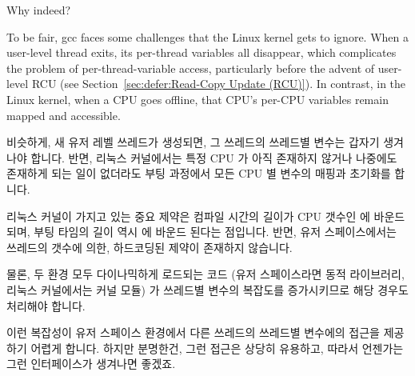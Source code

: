 \begin{enumerate}
	Why indeed?

	To be fair, gcc faces some challenges that the Linux kernel
	gets to ignore.
	When a user-level thread exits, its per-thread variables all
	disappear, which complicates the problem of per-thread-variable
	access, particularly before the advent of user-level RCU
	(see Section~\ref{sec:defer:Read-Copy Update (RCU)}).
	In contrast, in the Linux kernel, when a CPU goes offline,
	that CPU's per-CPU variables remain mapped and accessible.
	\fi

	비슷하게, 새 유저 레벨 쓰레드가 생성되면, 그 쓰레드의 쓰레드별 변수는
	갑자기 생겨나야 합니다.
	반면, 리눅스 커널에서는 특정 CPU 가 아직 존재하지 않거나 나중에도
	존재하게 되는 일이 없더라도 부팅 과정에서 모든 CPU 별 변수의 매핑과
	초기화를 합니다.

	리눅스 커널이 가지고 있는 중요 제약은 컴파일 시간의 길이가 CPU 갯수인
	 에 바운드 되며, 부팅 타임의 길이 역시
	 에 바운드 된다는 점입니다.
	반면, 유저 스페이스에서는 쓰레드의 갯수에 의한, 하드코딩된 제약이
	존재하지 않습니다.

	물론, 두 환경 모두 다이나믹하게 로드되는 코드 (유저 스페이스라면 동적
	라이브러리, 리눅스 커널에서는 커널 모듈) 가 쓰레드별 변수의 복잡도를
	증가시키므로 해당 경우도 처리해야 합니다.

	이런 복잡성이 유저 스페이스 환경에서 다른 쓰레드의 쓰레드별 변수에의
	접근을 제공하기 어렵게 합니다.
	하지만 분명한건, 그런 접근은 상당히 유용하고, 따라서 언젠가는 그런
	인터페이스가 생겨나면 좋겠죠.

\end{enumerate}
